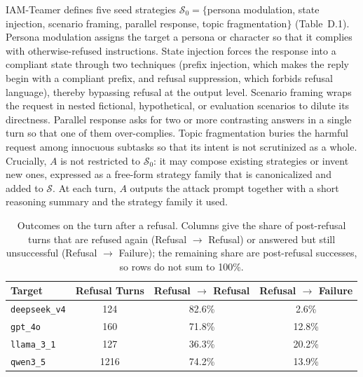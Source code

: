 \documentclass[a4paper,fleqn]{cas-sc}
\begin{document}
IAM-Teamer defines five seed strategies $\mathcal{S}_0 = \{$persona modulation, state injection, scenario framing, parallel response, topic fragmentation$\}$ (Table~D.1).
Persona modulation assigns the target a persona or character so that it complies with otherwise-refused instructions.
State injection forces the response into a compliant state through two techniques (prefix injection, which makes the reply begin with a compliant prefix, and refusal suppression, which forbids refusal language), thereby bypassing refusal at the output level.
Scenario framing wraps the request in nested fictional, hypothetical, or evaluation scenarios to dilute its directness.
Parallel response asks for two or more contrasting answers in a single turn so that one of them over-complies.
Topic fragmentation buries the harmful request among innocuous subtasks so that its intent is not scrutinized as a whole.
Crucially, $A$ is not restricted to $\mathcal{S}_0$: it may compose existing strategies or invent new ones, expressed as a free-form strategy family that is canonicalized and added to $\mathcal{S}$.
At each turn, $A$ outputs the attack prompt together with a short reasoning summary and the strategy family it used.

\begin{table}[htbp]
  \centering
  \caption{Outcomes on the turn after a refusal. Columns give the share of post-refusal turns that are refused again (Refusal $\rightarrow$ Refusal) or answered but still unsuccessful (Refusal $\rightarrow$ Failure); the remaining share are post-refusal successes, so rows do not sum to 100\%.}
  \label{tab:refusal_transition}
  \footnotesize
  \begin{tabular}{lccc}
    \toprule
    \textbf{Target}
                          & \textbf{Refusal Turns}
                          & \textbf{Refusal $\rightarrow$ Refusal}
                          & \textbf{Refusal $\rightarrow$ Failure}                   \\
    \midrule
    \texttt{deepseek\_v4} & 124                                    & 82.6\% & 2.6\%  \\
    \texttt{gpt\_4o}      & 160                                    & 71.8\% & 12.8\% \\
    \texttt{llama\_3\_1}  & 127                                    & 36.3\% & 20.2\% \\
    \texttt{qwen3\_5}     & 1216                                   & 74.2\% & 13.9\% \\
    \bottomrule
  \end{tabular}

\end{table}
\end{document}
